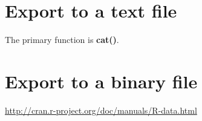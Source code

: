 \section{Export to a text file}
\label{sec:export-text-file}

The primary function is {\bf cat()}. 


\section{Export to a binary file}
\label{sec:export-binary-file}


\url{http://cran.r-project.org/doc/manuals/R-data.html}

